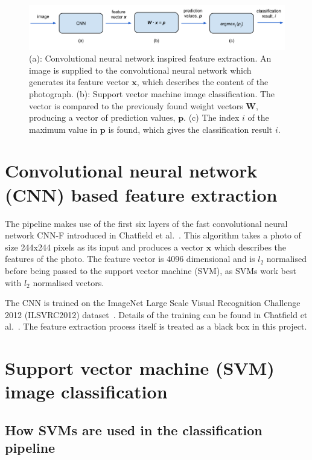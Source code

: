 \documentclass[11pt, a4paper]{report}
\newcommand{\vect}[1]{\boldsymbol{#1}}
\begin{document}
\begin{figure}[hbt]
	\centering
  \includegraphics[totalheight=3cm]{img/08.png}
  \caption{(a): Convolutional neural network inspired feature extraction. An image is supplied to the convolutional neural network which generates its feature vector $\vect{x}$, which describes the content of the photograph. (b): Support vector machine image classification. The vector is compared to the previously found weight vectors $\vect{W}$, producing a vector of prediction values, $\vect{p}$. (c) The index $i$ of the maximum value in $\vect{p}$ is found, which gives the classification result $i$.}
  \label{img:08}
\end{figure}


\section{Convolutional neural network (CNN) based feature extraction}

The pipeline makes use of the first six layers of the fast convolutional neural network CNN-F introduced in Chatfield et al.~\cite{Chatfield14}. This algorithm takes a photo of size 244x244 pixels as its input and produces a vector $\vect{x}$ which describes the features of the photo. The feature vector is 4096 dimensional and is $l_2$ normalised before being passed to the support vector machine (SVM), as SVMs work best with $l_2$ normalised vectors.

The CNN is trained on the ImageNet Large Scale Visual Recognition Challenge 2012 (ILSVRC2012) dataset~\cite{CNN:Imagenet}. Details of the training can be found in Chatfield et al.~\cite{Chatfield14}. The feature extraction process itself is treated as a black box in this project. 

 


\section{Support vector machine (SVM) image classification}

\subsection{How SVMs are used in the classification pipeline}
\end{document}
